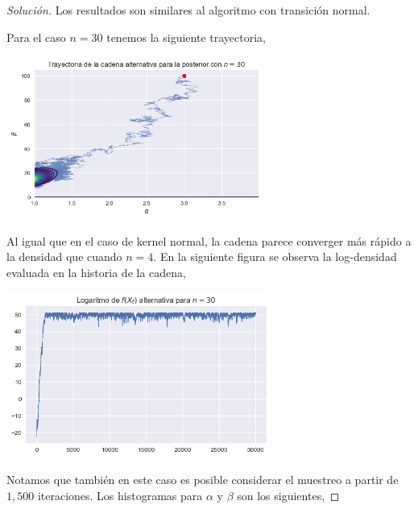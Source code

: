 \documentclass{article}
\begin{document}
\begin{enumerate}
\begin{proof}[Solución]
        Los resultados son similares al algoritmo con transición normal.

        Para el caso $n=30$ tenemos la siguiente trayectoria,

        \begin{center}
            \includegraphics[width=0.63\textwidth]{tarea7/trajsemi30.png}
        \end{center}

        Al igual que en el caso de kernel normal, la cadena parece converger más rápido a la
        densidad que cuando $n=4$. En la siguiente figura se observa la log-densidad evaluada
        en la historia de la cadena,

        \begin{center}
            \includegraphics[width=0.65\textwidth]{tarea7/logsemic30.png}
        \end{center}

        Notamos que también en este caso es posible considerar el muestreo a partir de $1,500$
        iteraciones. Los histogramas para $\alpha$ y $\beta$ son los siguientes,


\end{proof}
\end{enumerate}
\end{document}

